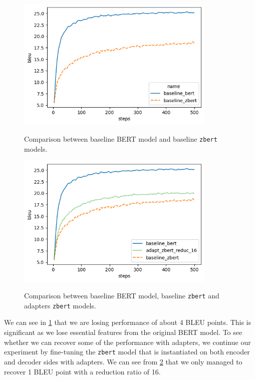 \begin{figure}[]
    {\includegraphics[width=0.85\textwidth]{img/baseline_zbert.png}}
    \centering
    \caption{Comparison between baseline BERT model and baseline \texttt{zbert} models.}
    \label{img:baseline_zbert}
\end{figure}

\begin{figure}[]
    {\includegraphics[width=0.85\textwidth]{img/adapter_zbert.png}}
    \centering
    \caption{Comparison between baseline BERT model, baseline \texttt{zbert} and adapters \texttt{zbert} models.}
    \label{img:adapter_zbert}
\end{figure}

We can see in \cref{img:baseline_zbert} that we are losing performance of about 4 BLEU points. This is significant as we lose essential features from the original BERT model. To see whether we can recover some of the performance with adapters, we continue our experiment by fine-tuning the \texttt{zbert} model that is instantiated on both encoder and decoder sides with adapters. We can see from \cref{img:adapter_zbert} that we only managed to recover 1 BLEU point with a reduction ratio of 16.

